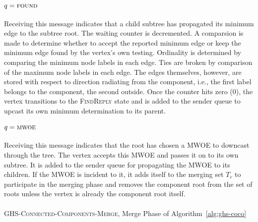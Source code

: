 \documentclass[11pt,epsf]{article}
\begin{document}
{{    \paragraph{$q = \textsc{found}$}{
      Receiving this message indicates that a child subtree has propagated its minimum edge to the subtree
      root. The waiting counter is decremented. A comparsion is made to determine whether to accept the
      reported minimum edge or keep the minimum edge found by the vertex's own testing. Ordinality is
      determined by comparing the minimum node labels in each edge. Ties are broken by comparison of the
      maximum node labels in each edge. The edges themselves, however, are stored with respect to direction
      radiating from the component, i.e., the first label belongs to the component, the second outside.
      Once the counter hits zero (0), the vertex transitions to the \textsc{FindReply} state and is added
      to the sender queue to upcast its own minimum determination to its parent.
    }
    \paragraph{$q = \textsc{mwoe}$}{
      Receiving this message indicates that the root has chosen a MWOE to downcast through the tree.
      The vertex accepts this MWOE and passes it on to its own subtree. It is added to the sender queue
      for propagating the MWOE to its children. If the MWOE is incident to it, it adds itself to the
      merging set $T_r$ to participate in the merging phase and removes the component root from the set
      of roots unless the vertex is already the component root itself.
    }

    \paragraph{}{
      \begin{algorithm}
        \footnotesize
        \caption{\textsc{GHS-Connected-Components-Merge}, Merge Phase of Algorithm~\ref{alg:ghs-coco} }
        \label{alg:ghs-coco-merge}
        \begin{algorithmic}
          \ENDFOR


\end{algorithmic}
\end{algorithm}}}}
\end{document}
